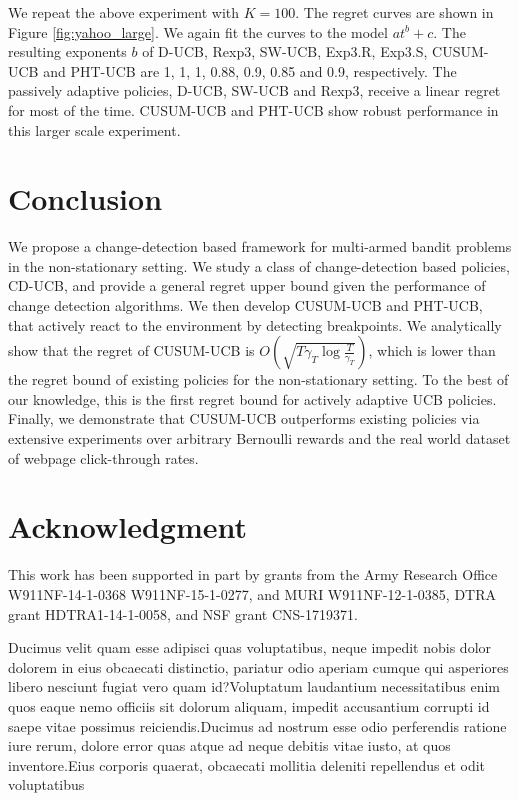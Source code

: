 \documentclass[letterpaper]{article} %
\newcommand{\green}{}
\begin{document}
{\green
{}
We repeat the above experiment with $K=100$. The regret curves are shown in Figure \ref{fig:yahoo_large}. We again fit the curves to the model $at^b+c$. The resulting exponents $b$ of D-UCB, Rexp3, SW-UCB, Exp3.R, Exp3.S, CUSUM-UCB and PHT-UCB are 1, 1, 1, 0.88, 0.9, 0.85 and 0.9, respectively. The passively adaptive policies, D-UCB, SW-UCB and Rexp3, receive
a linear regret for most of the time. CUSUM-UCB and PHT-UCB show robust performance in this larger scale experiment.
}
\section{Conclusion}\label{sec:conclusion}
We propose a change-detection based framework for multi-armed bandit
problems in the non-stationary setting. We study a class of
change-detection based policies, CD-UCB, and provide a general regret
upper bound given the performance of change detection algorithms. We
then develop CUSUM-UCB and PHT-UCB, that actively react to the environment by
detecting breakpoints.
We analytically show that the regret of CUSUM-UCB is
$O(\sqrt{T\gamma_T\log{\frac{T}{\gamma_T}}})$, which is lower than the
regret bound of existing policies for the non-stationary setting.
To the best of our knowledge, this is the first regret bound for
actively adaptive UCB policies.
Finally, we demonstrate that CUSUM-UCB outperforms existing policies
via extensive experiments over arbitrary Bernoulli rewards and the
real world dataset of webpage click-through rates.

\section*{Acknowledgment}
This work has been supported in part by grants  from the Army Research Office  W911NF-14-1-0368 W911NF-15-1-0277, and MURI W911NF-12-1-0385, DTRA grant HDTRA1-14-1-0058, and NSF grant CNS-1719371.

%

Ducimus velit quam esse adipisci quas voluptatibus, neque impedit nobis dolor dolorem in eius obcaecati distinctio, pariatur odio aperiam cumque qui asperiores libero nesciunt fugiat vero quam id?Voluptatum laudantium necessitatibus enim quos eaque nemo officiis sit dolorum aliquam, impedit accusantium corrupti id saepe vitae possimus reiciendis.Ducimus ad nostrum esse odio perferendis ratione iure rerum, dolore error quas atque ad neque debitis vitae iusto, at quos inventore.Eius corporis quaerat, obcaecati mollitia deleniti repellendus et odit voluptatibus

\end{document}
